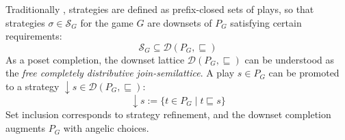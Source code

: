 \documentclass[sigplan,screen]{acmart}
\begin{document}
Traditionally \cite{gamesem99},
strategies are defined as
prefix-closed sets of plays,
so that strategies $\sigma \in \mathcal{S}_G$
for the game $G$ are downsets of $P_G$
satisfying certain requirements:
\[
    \mathcal{S}_G \subseteq
    \mathcal{D}(P_G, {\sqsubseteq})
\]
%
As a poset completion,
the downset lattice
$\mathcal{D}(P_G, {\sqsubseteq})$
can be understood as
the \emph{free completely distributive join-semilattice}.
A play $s \in P_G$ can be promoted to a strategy
${\downarrow} s \in \mathcal{D}(P_G, {\sqsubseteq})$:
\[
    {\downarrow} s := \{ t \in P_G \mid t \sqsubseteq s \}
\]
Set inclusion corresponds to strategy refinement, %
and the downset completion augments $P_G$ with
angelic choices.
\end{document}
